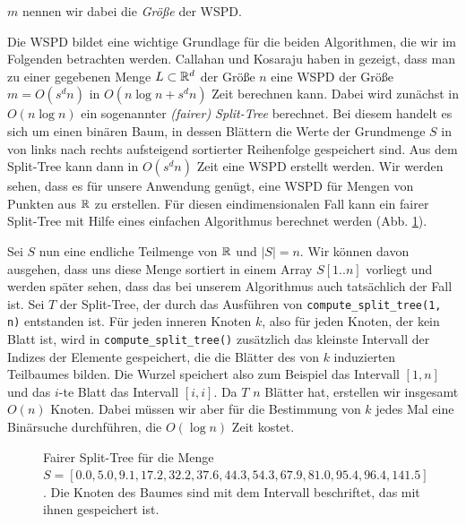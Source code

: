 \noindent $m$ nennen wir dabei die \emph{Größe} der WSPD.

Die WSPD bildet eine wichtige Grundlage für die beiden Algorithmen, die wir im Folgenden betrachten werden. 
Callahan und Kosaraju haben in \cite{callahan} gezeigt, dass man zu einer gegebenen Menge $L \subset \mathbb{R}^d$ der Größe $n$ eine WSPD  der Größe $m = O(s^dn)$ in $O(n\log n + s^dn)$ Zeit berechnen kann. 
Dabei wird zunächst in $O(n \log n)$ ein sogenannter \emph{(fairer) Split-Tree} berechnet. 
Bei diesem handelt es sich um einen binären Baum, in dessen Blättern die Werte der Grundmenge $S$ in von links nach rechts aufsteigend sortierter Reihenfolge gespeichert sind. 
Aus dem Split-Tree kann dann in $O(s^dn)$ Zeit eine WSPD erstellt werden. 
Wir werden sehen, dass es für unsere Anwendung genügt, eine WSPD für Mengen von Punkten aus $\mathbb{R}$ zu erstellen. 
Für diesen eindimensionalen Fall kann ein fairer Split-Tree mit Hilfe eines einfachen Algorithmus berechnet werden (Abb. \ref{fig:splittree}).



Sei $S$ nun eine endliche Teilmenge von $\mathbb{R}$ und $|S| = n$. 
Wir können davon ausgehen, dass uns diese Menge sortiert in einem Array $S[1..n]$ vorliegt und werden später sehen, dass das bei unserem Algorithmus auch tatsächlich der Fall ist. 
Sei $T$ der Split-Tree, der durch das Ausführen von \texttt{compute\_split\_tree(1, n)} entstanden ist.
Für jeden inneren Knoten $k$, also für jeden Knoten, der kein Blatt ist, wird in \texttt{compute\_split\_tree()} zusätzlich das kleinste Intervall der Indizes der Elemente gespeichert, die die Blätter des von $k$ induzierten Teilbaumes bilden.
Die Wurzel speichert also zum Beispiel das Intervall $[1, n]$ und das $i$-te Blatt das Intervall $[i, i]$.
Da $T$ $n$ Blätter hat, erstellen wir insgesamt $O(n)$ Knoten. 
Dabei müssen wir aber für die Bestimmung von $k$ jedes Mal eine Binärsuche durchführen, die $O(\log n)$ Zeit kostet. 

\begin{figure}
   	\caption{Fairer Split-Tree für die Menge $S=[0.0, 5.0, 9.1, 17.2, 32.2, 37.6, 44.3, 54.3, 67.9, 81.0, 95.4, 96.4, 141.5]$. Die Knoten des Baumes sind mit dem Intervall beschriftet, das mit ihnen gespeichert ist.}
   	\label{fig:splittree}
\end{figure}

